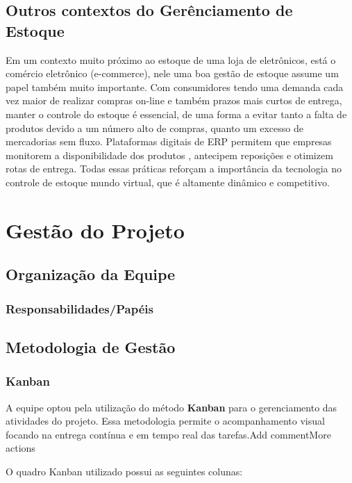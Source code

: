 \documentclass[
	12pt,				%
	openright,			%
	twoside,			%
	a4paper,			%
	english,			%
	french,				%
	spanish,			%
	brazil				%
	]{abntex2}
\begin{document}
\section{Outros contextos do Gerênciamento de Estoque}
Em um contexto muito próximo ao estoque de uma loja de eletrônicos, está o comércio eletrônico (e-commerce), nele uma boa gestão de estoque assume um papel também muito importante. Com consumidores tendo uma demanda cada vez maior de realizar compras on-line e também prazos mais curtos de entrega, manter o controle do estoque é essencial, de uma forma a evitar tanto a falta de produtos devido a um número alto de compras, quanto um excesso de mercadorias sem fluxo. Plataformas digitais de ERP permitem que empresas monitorem a disponibilidade dos produtos , antecipem reposições e otimizem rotas de entrega. Todas essas práticas reforçam a importância da tecnologia no controle de estoque mundo virtual, que é altamente dinâmico e competitivo.

\chapter{Gestão do Projeto}

\section{Organização da Equipe}

\subsection{Responsabilidades/Papéis}

\section{Metodologia de Gestão}

\subsection{Kanban}

A equipe optou pela utilização do método \textbf{Kanban} para o gerenciamento das atividades do projeto. Essa metodologia permite o acompanhamento visual focando na entrega contínua e em tempo real das tarefas.Add commentMore actions

O quadro Kanban utilizado possui as seguintes colunas:
\end{document}
